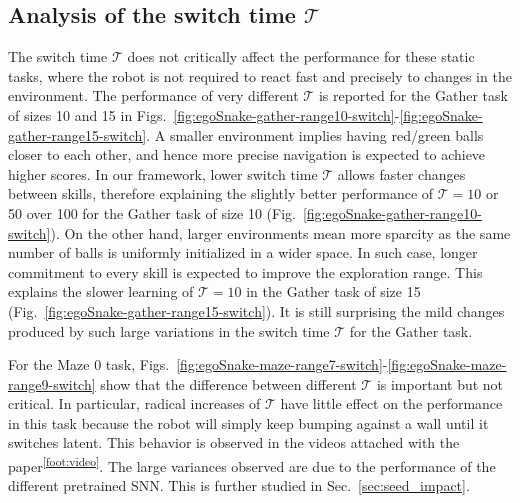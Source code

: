 \documentclass{article} %
\begin{document}
\subsection{Analysis of the switch time $\mathcal{T}$}
\label{sec:switch_time}
The switch time $\mathcal{T}$ does not critically affect the performance for these static tasks, where the robot is not required to react fast and precisely to changes in the environment. The performance of very different $\mathcal{T}$ is reported for the Gather task of sizes 10 and 15 in Figs.\ \ref{fig:egoSnake-gather-range10-switch}-\ref{fig:egoSnake-gather-range15-switch}. A smaller environment implies having red/green balls closer to each other, and hence more precise navigation is expected to achieve higher scores. In our framework, lower switch time $\mathcal{T}$ allows faster changes between skills, therefore explaining the slightly better performance of $\mathcal{T}=10$ or 50 over 100 for the Gather task of size 10 (Fig.\ \ref{fig:egoSnake-gather-range10-switch}). On the other hand, larger environments mean more sparcity as the same number of balls is uniformly initialized in a wider space. In such case, longer commitment to every skill is expected to improve the exploration range. This explains the slower learning of $\mathcal{T}=10$ in the Gather task of size 15 (Fig.\ \ref{fig:egoSnake-gather-range15-switch}). It is still surprising the mild changes produced by such large variations in the switch time $\mathcal{T}$ for the Gather task.

For the Maze 0 task, Figs.\ \ref{fig:egoSnake-maze-range7-switch}-\ref{fig:egoSnake-maze-range9-switch} show that the difference between different $\mathcal{T}$ is important but not critical. In particular, radical increases of $\mathcal{T}$ have little effect on the performance in this task because the robot will simply keep bumping against a wall until it switches latent. This behavior is observed in the videos attached with the paper\textsuperscript{\ref{foot:video}}. The large variances observed are due to the performance of the different pretrained SNN. This is further studied in Sec.\ \ref{sec:seed_impact}.
\end{document}
